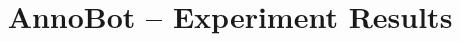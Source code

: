 \documentclass[aspectratio=169,14pt]{beamer}
\title{AnnoBot -- Experiment Results}
\date{}
\begin{document}
\frame{\titlepage}





\end{document}
